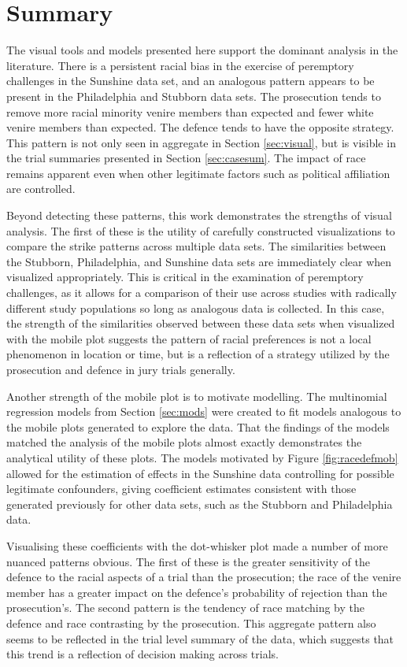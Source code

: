 \section{Summary}
\label{c:summary}

The visual tools and models presented here support the dominant
analysis in the literature. There is a persistent racial bias in the
exercise of peremptory challenges in the Sunshine data set, and an analogous pattern appears to be present in the Philadelphia and Stubborn data sets. The prosecution tends to remove more racial minority venire members than expected and fewer white venire members than expected. The defence tends to have the opposite strategy. This pattern is not only seen in aggregate in Section \ref{sec:visual}, but is visible in the trial summaries
presented in Section \ref{sec:casesum}. The impact of race remains apparent even when other legitimate factors
such as political affiliation are controlled.

Beyond detecting these patterns, this work demonstrates the strengths of visual
analysis. The first of these is the utility of carefully constructed visualizations to compare the strike patterns across multiple data sets. The
similarities between the Stubborn, Philadelphia, and Sunshine data sets are immediately clear when visualized appropriately. This
is critical in the examination of peremptory challenges, as it allows for a comparison of their use across studies with
radically different study populations so long as analogous data is collected. In this case, the strength of the similarities observed between these data sets when visualized with the mobile plot suggests the pattern of racial preferences is not a local phenomenon in location or time, but is a reflection of a strategy utilized by the prosecution and defence in jury trials generally.

Another strength of the mobile plot is to motivate modelling. The multinomial regression models from Section \ref{sec:mods}
were created to fit models analogous to the mobile plots generated to explore the data. That the findings of the
models matched the analysis of the mobile plots almost exactly
demonstrates the analytical utility of these plots. The models motivated by Figure \ref{fig:racedefmob} allowed for the estimation of effects in the Sunshine data controlling for possible legitimate confounders, giving
coefficient estimates consistent with those generated previously for other data sets, such as the Stubborn and Philadelphia data.

Visualising these coefficients with the dot-whisker plot made a number of more nuanced patterns obvious. The first of these is the greater sensitivity of the defence to the racial aspects of a trial than the
prosecution; the race of the venire member has a greater impact on the defence's probability of rejection than the
prosecution's. The second pattern is the tendency of race matching by
the defence and race contrasting by the prosecution. This aggregate pattern also seems to be reflected in the trial level
summary of the data, which suggests that this trend is a reflection of decision making across trials.

